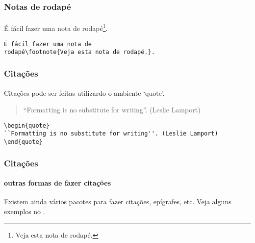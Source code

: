 \begin{frame}[fragile]
\frametitle{Notas de rodapé}
\framesubtitle{}
É fácil fazer uma nota de rodapé\footnote{Veja esta nota de rodapé.}.

\begin{verbatim}
É fácil fazer uma nota de 
rodapé\footnote{Veja esta nota de rodapé.}.
\end{verbatim}
\end{frame}

\begin{frame}[fragile]
\frametitle{Citações}
\framesubtitle{}
Citações pode ser feitas utilizardo o ambiente `quote'.
\begin{quote}
``Formatting is no substitute for writing''. (Leslie Lamport)
\end{quote}

\begin{scriptsize}
\begin{verbatim}
\begin{quote}
``Formatting is no substitute for writing''. (Leslie Lamport)
\end{quote}
\end{verbatim}
\end{scriptsize}
\end{frame}

\begin{frame}[fragile]
\frametitle{Citações}
\framesubtitle{outras formas de fazer citações}

Existem ainda vários pacotes para fazer citações, epígrafes, etc.
Veja alguns exemplos no .
\end{frame}
